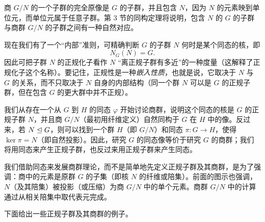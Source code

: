 商 $G/N$ 的一个子群的完全原像是 $G$ 的子群，并且包含 $N$，因为 $N$ 的元素映到单位元，而单位元属于任意子群。第 3 节的同构定理将说明，包含 $N$ 的 $G$ 的子群与商群 $G/N$ 的子群之间有一种自然对应。

现在我们有了一个“内部”准则，可精确判断 $G$ 的子群 $N$ 何时是某个同态的核，即
\[
  N_G(N)=G.
\]
因此可把子群 $N$ 的正规化子看作 $N$ “离正规子群有多近”的一种度量（这解释了正规化子这个名称）。要记住，正规性是一种\emph{嵌入性质}，也就是说，它取决于 $N$ 与 $G$ 的关系，而不只取决于 $N$ 自身的内部结构（同一个群 $N$ 可以是 $G$ 的正规子群，但在包含 $G$ 的更大群中并不正规）。

我们从存在一个从 $G$ 到 $H$ 的同态 $\varphi$ 开始讨论商群，说明这个同态的核是 $G$ 的正规子群 $N$，并且商 $G/N$（最初用纤维定义）自然同构于 $G$ 在 $H$ 中的像。反过来，若 $N\trianglelefteq G$，则可以找到一个群 $H$（即 $G/N$）和同态 $\pi:G\to H$，使得 $\ker\pi=N$（即自然投影）。因此，研究 $G$ 的同态像等价于研究 $G$ 的商群；我们将用同态来产生正规子群，也反过来用正规子群来产生同态。

我们借助同态来发展商群理论，而不是简单地先定义正规子群及其商群，是为了强调：商中的元素是原群 $G$ 的子集（即核 $N$ 的纤维或陪集）。前面的图示也强调，$N$（及其陪集）被投影（或压缩）为商 $G/N$ 中的单个元素。商群 $G/N$ 中的计算通过从相关陪集中取代表元完成。

下面给出一些正规子群及其商群的例子。

